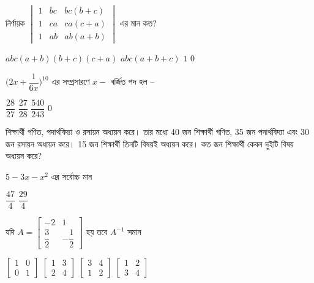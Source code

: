 \documentclass[addpoints]{exam}
\begin{document}
\begin{questions}

 \question নির্ণায়ক $ \begin{vmatrix}
 1 & bc & bc(b+c)\\
 1 & ca & ca(c+a)\\
 1 & ab & ab(a+b)
\end{vmatrix}   $  এর মান কত?

\begin{oneparchoices}
\choice $ abc(a+b)(b+c)(c+a) $
\choice $ abc(a+b+c) $
\choice $ 1 $
\choice $ 0 $
\end{oneparchoices}

\question $ \Bigg(2x + \dfrac{1}{6x} \Bigg)^{10} $ এর সম্প্রসারণে $ x- $ বর্জিত পদ হল – 

\begin{oneparchoices}
\choice $ \dfrac{28}{27} $
\choice $ \dfrac{27}{28} $
\choice $ \dfrac{540}{243} $
\choice  $ 0 $
\end{oneparchoices}

 শিক্ষার্থী গণিত, পদার্থবিদ্যা ও রসায়ন অধ্যয়ন করে। তার মধ্যে 40 জন শিক্ষার্থী গণিত, 35 জন পদার্থবিদ্যা এবং 30 জন রসায়ন অধ্যয়ন করে। 15 জন শিক্ষার্থী তিনটি বিষয়ই অধ্যয়ন করে। কত জন শিক্ষার্থী কেবল দুইটি বিষয় অধ্যয়ন করে?


\begin{oneparchoices}

\end{oneparchoices}

\question $ 5-3x-x^{2} $  এর সর্বোচ্চ মান

\begin{oneparchoices}
\choice $ \dfrac{47}{4} $
\choice $ \dfrac{29}{4} $
\end{oneparchoices}

\question  যদি $ A = \begin{bmatrix}
-2 & 1\\
\dfrac{3}{2} & -\dfrac{1}{2} 
\end{bmatrix} $ হয় তবে $ A^{-1} $ সমান

\begin{oneparchoices}
\choice $\begin{bmatrix}
1 & 0\\
0 & 1 
\end{bmatrix} $
\choice $\begin{bmatrix}
1 & 3\\
2 & 4 
\end{bmatrix} $
\choice $\begin{bmatrix}
3 & 4\\
1 & 2 
\end{bmatrix} $
\choice $\begin{bmatrix}
1 & 2\\
3 & 4 
\end{bmatrix} $
\end{oneparchoices}


\end{questions}
\end{document}
